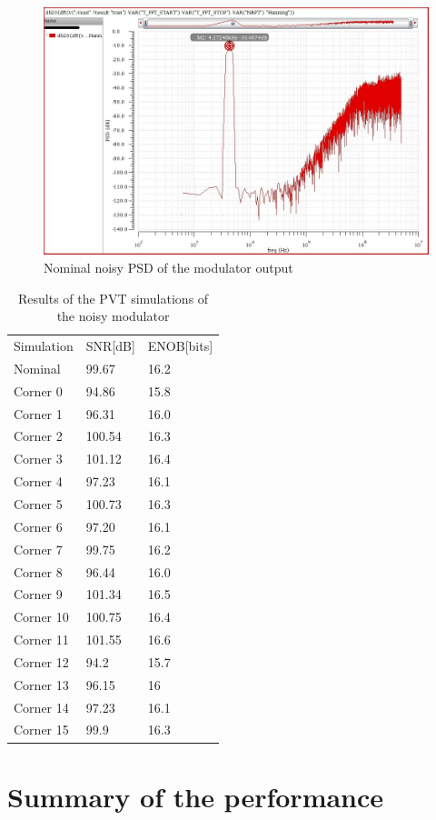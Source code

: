 \begin{figure}[H]
\centering
\includegraphics[width=\textwidth]{images/psd_noise_out.jpg}
\caption{Nominal noisy PSD of the modulator output }
\label{psd_noise_out}
\end{figure}

\begin{table}[H]
\centering

\caption{Results of the PVT simulations of the noisy modulator}
\label{modul_noisy_out}
\begin{tabular}{l|l|l}
\hline
\multirow{1}{*}{Simulation} & \multicolumn{1}{c|}{SNR[dB]} & \multicolumn{1}{c}{ENOB[bits]} \\\cline{1-3}
                       
            Nominal       & 99.67 & 16.2\\
            Corner 0      & 94.86 & 15.8\\
            Corner 1      & 96.31 & 16.0\\
            Corner 2      & 100.54 & 16.3\\
            Corner 3     & 101.12 & 16.4\\
            Corner 4     & 97.23 & 16.1\\
            Corner 5      & 100.73 & 16.3\\
            Corner 6      & 97.20 & 16.1\\
            Corner 7      & 99.75 & 16.2\\
            Corner 8      & 96.44 & 16.0\\
            Corner 9      & 101.34 & 16.5\\
            Corner 10      & 100.75 & 16.4\\
            Corner 11      & 101.55 & 16.6\\
            Corner 12      & 94.2 & 15.7\\
            Corner 13      & 96.15 & 16\\
            Corner 14      & 97.23 & 16.1\\
            Corner 15      & 99.9 & 16.3\\
            
\hline            
\end{tabular}
\end{table}


\section{Summary of the performance }